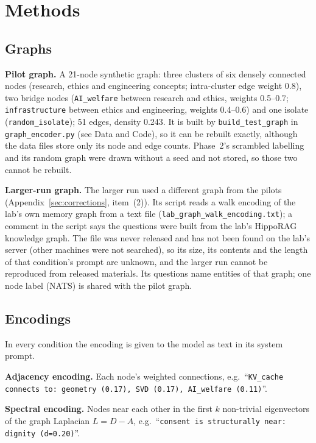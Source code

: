 \documentclass[11pt,a4paper]{article}
\begin{document}
\section{Methods}

\subsection{Graphs}

\textbf{Pilot graph.} A 21-node synthetic graph: three clusters of six densely connected nodes (research, ethics and engineering concepts; intra-cluster edge weight 0.8), two bridge nodes (\texttt{AI\_welfare} between research and ethics, weights 0.5--0.7; \texttt{infrastructure} between ethics and engineering, weights 0.4--0.6) and one isolate (\texttt{random\_isolate}); 51 edges, density 0.243. It is built by \texttt{build\_test\_graph} in \texttt{graph\_encoder.py} (see Data and Code), so it can be rebuilt exactly, although the data files store only its node and edge counts. Phase~2's scrambled labelling and its random graph were drawn without a seed and not stored, so those two cannot be rebuilt.

\textbf{Larger-run graph.} The larger run used a different graph from the pilots (Appendix~\ref{sec:corrections}, item~(2)). Its script reads a walk encoding of the lab's own memory graph from a text file (\nolinkurl{lab_graph_walk_encoding.txt}); a comment in the script says the questions were built from the lab's HippoRAG knowledge graph. The file was never released and has not been found on the lab's server (other machines were not searched), so its size, its contents and the length of that condition's prompt are unknown, and the larger run cannot be reproduced from released materials. Its questions name entities of that graph; one node label (NATS) is shared with the pilot graph.

\subsection{Encodings}

In every condition the encoding is given to the model as text in its system prompt.

\textbf{Adjacency encoding.} Each node's weighted connections, e.g.\ ``\texttt{KV\_cache connects to: geometry (0.17), SVD (0.17), AI\_welfare (0.11)}''.

\textbf{Spectral encoding.} Nodes near each other in the first $k$ non-trivial eigenvectors of the graph Laplacian $L = D - A$, e.g.\ ``\texttt{consent is structurally near: dignity (d=0.20)}''.
\end{document}
